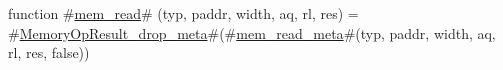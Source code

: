 function #\hyperref[sailRISCVzmemzyread]{mem\_read}# (typ, paddr, width, aq, rl, res) =
  #\hyperref[sailRISCVzMemoryOpResultzydropzymeta]{MemoryOpResult\_drop\_meta}#(#\hyperref[sailRISCVzmemzyreadzymeta]{mem\_read\_meta}#(typ, paddr, width, aq, rl, res, false))
